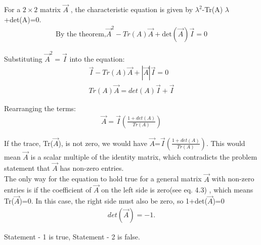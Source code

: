 \documentclass[journal]{IEEEtran}
\begin{document}
For a $2\times2$ matrix $\vec{A}$ , the characteristic equation is given by $\lambda^2$-Tr(A) $\lambda$+det(A)=0.\\
\begin{align}
    \text{By the theorem,}  \vec{A}^2 -Tr(A) \vec{A} +\text{det}(\vec{A}) \vec{I} =0
\end{align}



Substituting $\vec{A}^2 = \vec{I}$ into the equation:\\
\begin{align}
      \vec{I}  - Tr(A) \vec{A} + |\vec{A}|\vec{I} =0\\
   Tr(A) \vec{A} =det(A) \vec{I} +  \vec{I}  
\end{align}
   
   
Rearranging the terms:\\
\begin{align}
     \vec{A} = \vec{I}(\frac{1+det(A)}{Tr(A)}) 
\end{align}



If the trace, Tr($\vec{A}$), is not zero, we would have $\vec{A}$=$\vec{I}(\frac{1+det(A)}{Tr(A)})$. This would mean $\vec{A}$ is a scalar multiple of the identity matrix, which contradicts the problem statement that $\vec{A}$ has non-zero entries.\\

The only way for the equation to hold true for a general matrix $\vec{A}$ with non-zero entries is if the coefficient of $\vec{A}$ on the left side is zero(see eq. 4.3) , which means Tr($\vec{A}$)=0. In this case, the right side must also be zero, so 1+det($\vec{A}$)=0 \qquad 
\begin{align}
      det( \vec{A} )=-1.
\end{align}
  
    \begin{center}
    Statement - 1 is true, Statement - 2 is false.
\end{center}
\end{document}
